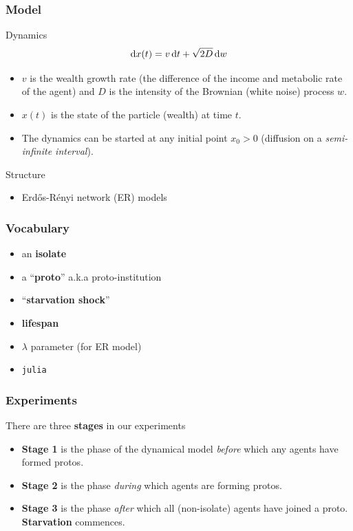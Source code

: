 \documentclass{beamer}
\begin{document}
\begin{frame}[t]
\frametitle{Model}

Dynamics
\begin{equation}\label{ddm}
\dif x(t) = v\dif t + \sqrt{2D} \dif w
\end{equation}

\begin{itemize}
\item $v$ is the wealth growth rate (the difference of the income and metabolic
rate of the agent) and $D$ is the intensity of the Brownian (white noise)
process $w$. 
\item $x(t)$ is the state of the particle (wealth) at time $t$. 
\item The dynamics can be started at any initial point $x_0 > 0$ (diffusion on
a \textit{semi-infinite interval}).
\end{itemize}
Structure
\begin{itemize}
\item Erd\H{o}s-R\'{e}nyi network (ER) models
\end{itemize}
\end{frame}

\begin{frame}[t]
\frametitle{Vocabulary}
\begin{itemize}
\item an \textbf{isolate}
\item a ``\textbf{proto}'' a.k.a proto-institution
\item ``\textbf{starvation shock}''
\item \textbf{lifespan}
\item $\lambda$ parameter (for ER model)
\item \texttt{julia}
\end{itemize}
\end{frame}

\begin{frame}[t]
\frametitle{Experiments}
\bigskip
There are three \textbf{stages} in our experiments
\smallskip
\begin{itemize}
\item \textbf{Stage 1} is the phase of the dynamical model \textit{before}
which any agents have formed protos.
\item \textbf{Stage 2} is the phase \textit{during} which agents are forming protos.
\item \textbf{Stage 3} is the phase \textit{after} which all (non-isolate)
agents have joined a proto. \textbf{Starvation} commences.
\end{itemize}
\end{frame}
\end{document}
